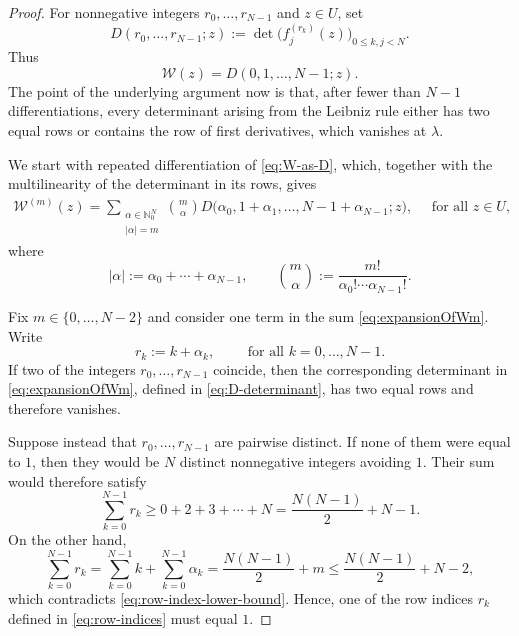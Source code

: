\documentclass[11pt]{amsart}
\numberwithin{equation}{section}
\theoremstyle{definition}
\theoremstyle{remark}
\newcommand{\N}{\mathbb N}
\newcommand{\cW}{\mathcal W}
\begin{document}
\begin{proof}
    For nonnegative integers $r_0,\ldots,r_{N-1}$ and $z\in U$, set
    \begin{equation}\label{eq:D-determinant}
        D(r_0,\ldots,r_{N-1};z)
        :=
        \det\bigl(f_j^{(r_k)}(z)\bigr)_{0\leq k,j<N}.
    \end{equation}
    Thus
    \begin{equation}\label{eq:W-as-D}
        \cW(z)=D(0,1,\ldots,N-1;z).
    \end{equation}
    The point of the underlying argument now is that, after fewer than $N-1$ differentiations, every determinant arising from the Leibniz rule either has two equal rows or contains the row of first derivatives, which vanishes at $\lambda$.
    
    We start with repeated differentiation of \eqref{eq:W-as-D}, which, together with the multilinearity of the determinant in its rows, gives
    \begin{align}\label{eq:expansionOfWm}
        \cW^{(m)}(z)
        =
        \sum_{\substack{\alpha\in\N_0^N\\ |\alpha|=m}}
        \binom{m}{\alpha}
        D\bigl(
            \alpha_0,
            1+\alpha_1,
            \ldots,
            N-1+\alpha_{N-1};
            z
        \bigr), \quad \text{ for all } z \in U,
    \end{align}
    where
    \begin{equation}
        |\alpha|:=\alpha_0+\cdots+\alpha_{N-1},
        \qquad
        \binom{m}{\alpha}
        :=
        \frac{m!}{\alpha_0!\cdots\alpha_{N-1}!}.
    \end{equation}
    
    Fix $m\in\{0,\ldots,N-2\}$ and consider one term in the sum \eqref{eq:expansionOfWm}. Write
    \begin{equation}\label{eq:row-indices}
        r_k:=k+\alpha_k,
        \qquad \text{ for all } k=0,\ldots,N-1.
    \end{equation}
    If two of the integers $r_0,\ldots,r_{N-1}$ coincide, then the corresponding determinant in \eqref{eq:expansionOfWm}, defined in \eqref{eq:D-determinant}, has two equal rows and therefore vanishes.
    
    Suppose instead that $r_0,\ldots,r_{N-1}$ are pairwise distinct. If none of them were equal to $1$, then they would be $N$ distinct nonnegative integers avoiding $1$. Their sum would therefore satisfy
    \begin{equation}\label{eq:row-index-lower-bound}
        \sum_{k=0}^{N-1}r_k
        \geq
        0+2+3+\cdots+N
        =
        \frac{N(N-1)}{2}+N-1.
    \end{equation}
    On the other hand,
    \begin{equation}\label{eq:row-index-upper-bound}
        \sum_{k=0}^{N-1}r_k
        =
        \sum_{k=0}^{N-1}k+\sum_{k=0}^{N-1}\alpha_k
        =
        \frac{N(N-1)}{2}+m
        \leq
        \frac{N(N-1)}{2}+N-2,
    \end{equation}
    which contradicts \eqref{eq:row-index-lower-bound}. Hence, one of the row indices $r_k$ defined in \eqref{eq:row-indices} must equal $1$.
    

\end{proof}
\end{document}
